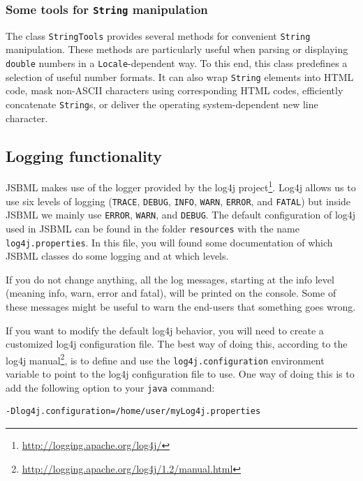 \subsubsection{Some tools for \texttt{String} manipulation}

The class \texttt{StringTools}
%
provides several methods for convenient \texttt{String} manipulation. These
methods are particularly useful when parsing or displaying \texttt{double}
numbers in a \texttt{Locale}\hyp{}dependent way. To this end, this class
predefines a selection of useful number formats. It can also wrap
\texttt{String} elements into HTML code, mask non-ASCII characters using
corresponding HTML codes, efficiently concatenate \texttt{String}s, or deliver
the operating system\hyp{}dependent new line character.


\subsection{Logging functionality}
%

JSBML makes use of the logger provided by the log4j
project\footnote{\url{http://logging.apache.org/log4j/}}.
Log4j allows us to use six levels
of logging (\texttt{TRACE}, \texttt{DEBUG},
\texttt{INFO}, \texttt{WARN}, \texttt{ERROR}, and \texttt{FATAL}) but inside
JSBML we mainly use \texttt{ERROR}, \texttt{WARN}, and \texttt{DEBUG}. The
default configuration of log4j used in JSBML can be found in the folder
\texttt{resources} with the name \texttt{log4j.properties}.
In this file, you will found some documentation of which JSBML classes do some
logging and at which levels.
 
If you do not change anything, all the log messages, starting at the info level 
(meaning info, warn, error and fatal), will be printed on the console.
Some of these messages might be useful to warn the end-users that something
goes wrong.


If you want to modify the default log4j behavior, you will need to create a
customized log4j configuration file. The best way of doing this, according to
the log4j
manual\footnote{\url{http://logging.apache.org/log4j/1.2/manual.html}}, is to
define and use the \texttt{log4j.configuration} environment variable to point to
the log4j configuration file to use. One way of doing this is to add the
following option to your \texttt{java} command:
\begin{lstlisting}[language=bash,numbers=none,captionpos=t]
-Dlog4j.configuration=/home/user/myLog4j.properties
\end{lstlisting}


